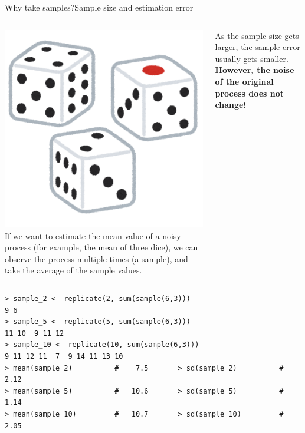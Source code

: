 \begin{frame}[fragile]{Why take samples?}{Sample size and estimation error}

  \begin{columns}
      \includegraphics[width=\textwidth]{../img/irasutoya_dice}
      If we want to estimate the mean value of a noisy process (for example, the mean of three dice), we can observe the process multiple times (a sample), and take the average of the sample values.\bigskip

      As the sample size gets larger, the sample error \alert{usually} gets smaller. {\bf However, the noise of the original process does not change!}
  \end{columns}
{\smaller
\begin{verbatim}
> sample_2 <- replicate(2, sum(sample(6,3)))
9 6
> sample_5 <- replicate(5, sum(sample(6,3)))
11 10  9 11 12
> sample_10 <- replicate(10, sum(sample(6,3)))
9 11 12 11  7  9 14 11 13 10
> mean(sample_2)          #    7.5       > sd(sample_2)          # 2.12
> mean(sample_5)          #   10.6       > sd(sample_5)          # 1.14
> mean(sample_10)         #   10.7       > sd(sample_10)         # 2.05
\end{verbatim}}
\end{frame}

